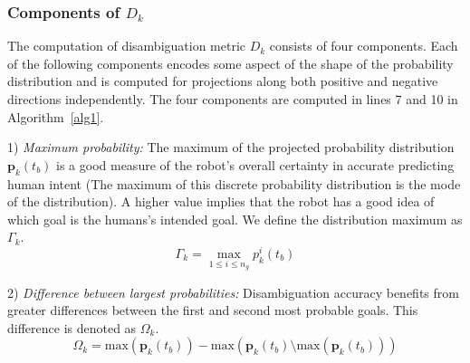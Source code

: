 \subsubsection{Components of $D_k$}\label{sssec:components}
The computation of disambiguation metric $D_k$ consists of four components. Each of the following components encodes some aspect of the shape of the probability distribution and is computed for projections along both positive and negative directions independently. The four components are computed in lines 7 and 10 in Algorithm~\ref{alg1}.

1) \textit{Maximum probability:} The maximum of the projected probability distribution $\boldsymbol{p}_k(t_b)$  is a good measure of the robot's overall certainty in accurate predicting human intent (The maximum of this discrete probability distribution is the mode of the distribution). A higher value implies that the robot has a good idea of which goal is the humans's intended goal. We define the distribution maximum as $\Gamma_k$.
\begin{equation}
\Gamma_k = \max\limits_{1 \leq i \leq n_g}p^i_k(t_b)
\end{equation}

2) \textit{Difference between largest probabilities:} Disambiguation accuracy benefits from greater differences between the first and second most probable goals. This difference is denoted as $\Omega_k$.
\begin{equation}
\Omega_k = \text{max}(\boldsymbol{p}_k(t_b)) - \text{max}(\boldsymbol{p}_k(t_b) \setminus \text{max}(\boldsymbol{p}_k(t_b)))
\end{equation}


